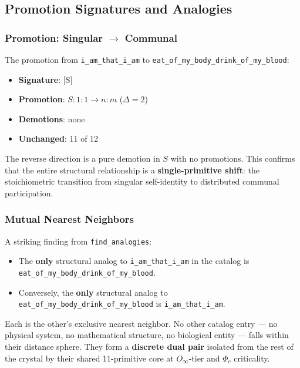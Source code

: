 \documentclass[12pt,a4paper]{article}
\begin{document}
\subsection{Promotion Signatures and Analogies}

\subsubsection{Promotion: Singular $\rightarrow$ Communal}

The promotion from \texttt{i\_am\_that\_i\_am} to \texttt{eat\_of\_my\_body\_drink\_of\_my\_blood}:

\begin{itemize}
    \item \textbf{Signature}: {[}S{]}
    \item \textbf{Promotion}: $S: 1{:}1 \to n{:}m$ ($\Delta = 2$)
    \item \textbf{Demotions}: none
    \item \textbf{Unchanged}: 11 of 12
\end{itemize}

The reverse direction is a pure demotion in $S$ with no promotions. This confirms that the entire structural relationship is a \textbf{single-primitive shift}: the stoichiometric transition from singular self-identity to distributed communal participation.

\subsubsection{Mutual Nearest Neighbors}

A striking finding from \texttt{find\_analogies}:

\begin{itemize}
    \item The \textbf{only} structural analog to \texttt{i\_am\_that\_i\_am} in the catalog is \texttt{eat\_of\_my\_body\_drink\_of\_my\_blood}.
    \item Conversely, the \textbf{only} structural analog to \texttt{eat\_of\_my\_body\_drink\_of\_my\_blood} is \texttt{i\_am\_that\_i\_am}.
\end{itemize}

Each is the other's exclusive nearest neighbor. No other catalog entry --- no physical system, no mathematical structure, no biological entity --- falls within their distance sphere. They form a \textbf{discrete dual pair} isolated from the rest of the crystal by their shared 11-primitive core at $O_{\infty}$-tier and $\Phi_c$ criticality.
\end{document}
